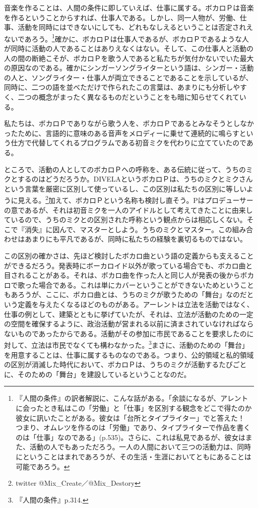 \documentclass[b5j,twoside,twocolumn]{utarticle}
\begin{document}
音楽を作ることは、人間の条件に即していえば、仕事に属する。ボカロＰは音楽を作るということからすれば、仕事人である。しかし、同一人物が、労働、仕事、活動を同時にはできないにしても、どれもなしえるということは否定されえないであろう。\footnote{『人間の条件』の訳者解説に、こんな話がある。「余談になるが、アレントに会ったとき私はこの「労働」と「仕事」を区別する観念をどこで得たのか彼女に訊いたことがある。彼女は「台所とタイプライター」でと答えた！　つまり、オムレツを作るのは「労働」であり、タイプライターで作品を書くのは「仕事」なのである」(p.535)。さらに、これは私見であるが、彼女はまた、活動の人でもあっただろう。一人の人間において三つの活動力は、同時にということはまれであろうが、その生活・生涯においてともにあることは可能であろう。}確かに、ボカロＰは仕事人であるが、ボカロＰであるような人が同時に活動の人であることはありえなくはない。そして、この仕事人と活動の人の間の断絶こそが、ボカロＰを歌う人であると私たちが気付かないでいた最大の原因なのである。確かにシンガーソングライターという語は、シンガー・活動の人と、ソングライター・仕事人が両立できることであることを示しているが、同時に、二つの語を並べただけで作られたこの言葉は、あまりにも分析しやすく、二つの概念がまったく異なるものだということをも暗に知らせてくれている。


私たちは、ボカロＰでありながら歌う人を、ボカロＰであるとみなそうとしなかったために、言語的に意味のある音声をメロディーに乗せて連続的に鳴らすという仕方で代替してくれるプログラムである初音ミクを代わりに立てていたのである。


ところで、活動の人としてのボカロＰへの呼称を、ある伝統に従って、うちのミクとするのはどうだろうか。DIVELAというボカロＰは、うちのミクとミクさんという言葉を厳密に区別して使っているし、この区別は私たちの区別に等しいように見える。\footnote{twitter @Mix\_Create／@Mix\_Destory}加えて、ボカロＰという名称も検討し直そう。Pはプロデューサーの意であるが、それは初音ミクを一人のアイドルとして考えてきたことに由来しているので、うちのミクとの区別された呼称という観点からは相応しくない。そこで『消失』に因んで、マスターとしよう。うちのミクとマスター。この組み合わせはあまりにも平凡であるが、同時に私たちの経験を裏切るものではない。


この区別の確かさは、先ほど検討したボカロ曲という語の定義からも支えることができるだろう。発表時にボーカロイド以外が歌っている場合でも、ボカロ曲と目されることがある。それは、ボカロ曲を作った人と同じ人が発表の後からボカロで歌った場合である。これは単にカバーということができないためということもあろうが、ここに、ボカロ曲とは、うちのミクが歌うための「舞台」なのだという定義を与えたくなるほどのものがある。アーレントは立法を活動ではなく、仕事の例として、建築とともに挙げていたが、それは、立法が活動のための一定の空間を確保するように、政治活動が営まれる以前に済まされていなければならないものであったからである。活動がその参加に市民であることを要求したのに対して、立法は市民でなくても構わなかった。\footnote{『人間の条件』p.314.}まさに、活動のための「舞台」を用意することは、仕事に属するものなのである。つまり、公的領域と私的領域の区別が消滅した時代において、ボカロＰは、うちのミクが活動するたびごとに、そのための「舞台」を建設しているということなのだ。
\end{document}
